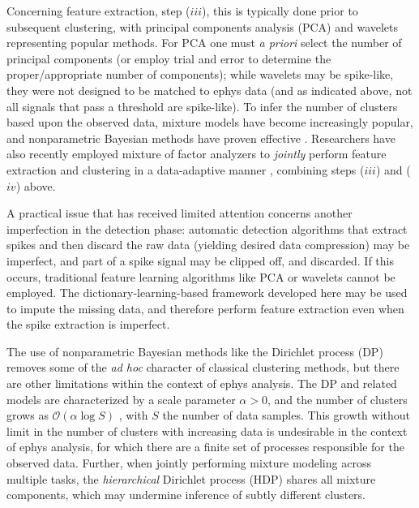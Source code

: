 \documentclass[journal]{IEEEtran}
\begin{document}
Concerning feature extraction, step ($iii$), this is typically done prior to subsequent clustering, with principal components analysis (PCA) \cite{Lewicki} and wavelets \cite{Letelier2000} representing popular methods. For PCA one must \emph{a priori} select the number of principal components (or employ trial and error to determine the proper/appropriate number of components); while wavelets may be spike-like, they were not designed to be matched to ephys data (and as indicated above, not all signals that pass a threshold are spike-like). To infer the number of clusters based upon the observed data, mixture models have become increasingly popular, and nonparametric Bayesian methods have proven effective \cite{Wood2009,Bo2011}. Researchers have also recently employed mixture of factor analyzers to \emph{jointly} perform feature extraction and clustering in a data-adaptive manner \cite{Dilan,Bo2011}, combining steps ($iii$) and ($iv$) above.

A practical issue that has received limited attention concerns another imperfection in the detection phase: automatic detection algorithms that extract spikes and then discard the raw data (yielding desired data compression) may be imperfect, and part of a spike signal may be clipped off, and discarded. If this occurs, traditional feature learning algorithms like PCA or wavelets cannot be employed. The dictionary-learning-based framework developed here may be used to impute the missing data, and therefore perform feature extraction even when the spike extraction is imperfect.

The use of nonparametric Bayesian methods like the Dirichlet process (DP) \cite{Wood2009,Bo2011} removes some of the \emph{ad hoc} character of classical clustering methods, but there are other limitations within the context of ephys analysis. The DP and related models are characterized by a scale parameter $\alpha>0$, and the number of clusters grows as $\mathcal{O}(\alpha \log S)$ \cite{Teh2010a}, with $S$ the number of data samples. This growth without limit in the number of clusters with increasing data is undesirable in the context of ephys analysis, for which there are a finite set of processes responsible for the observed data. Further, when jointly performing mixture modeling across multiple tasks, the \emph{hierarchical} Dirichlet process (HDP) \cite{HDP} shares all mixture components, which may undermine inference of subtly different clusters.
\end{document}
